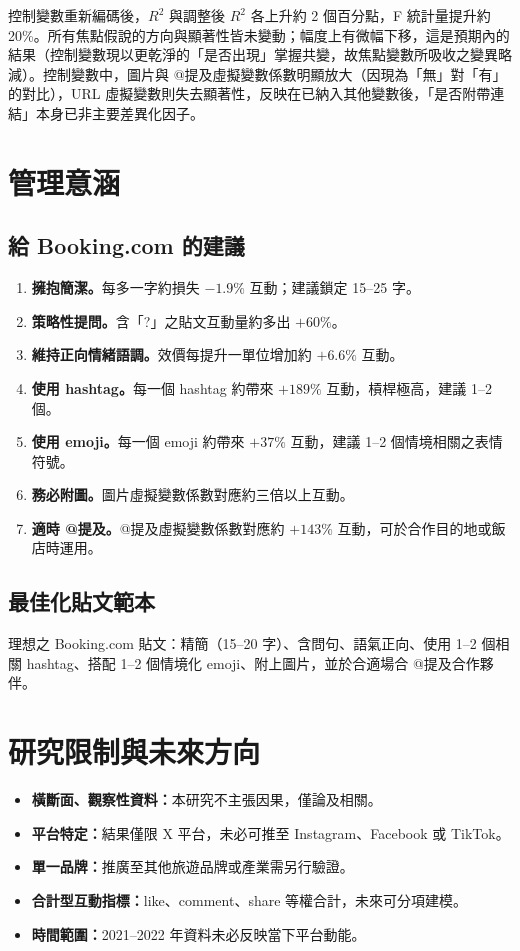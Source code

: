 \documentclass[12pt,a4paper]{ctexart}
\begin{document}
控制變數重新編碼後，$R^2$ 與調整後 $R^2$ 各上升約 2 個百分點，F 統計量提升約 20\%。所有焦點假說的方向與顯著性皆未變動；幅度上有微幅下移，這是預期內的結果（控制變數現以更乾淨的「是否出現」掌握共變，故焦點變數所吸收之變異略減）。控制變數中，圖片與 @提及虛擬變數係數明顯放大（因現為「無」對「有」的對比），URL 虛擬變數則失去顯著性，反映在已納入其他變數後，「是否附帶連結」本身已非主要差異化因子。

\section{管理意涵}

\subsection{給 Booking.com 的建議}

\begin{enumerate}
    \item \textbf{擁抱簡潔。}每多一字約損失 $-1.9\%$ 互動；建議鎖定 15--25 字。
    \item \textbf{策略性提問。}含「?」之貼文互動量約多出 $+60\%$。
    \item \textbf{維持正向情緒語調。}效價每提升一單位增加約 $+6.6\%$ 互動。
    \item \textbf{使用 hashtag。}每一個 hashtag 約帶來 $+189\%$ 互動，槓桿極高，建議 1--2 個。
    \item \textbf{使用 emoji。}每一個 emoji 約帶來 $+37\%$ 互動，建議 1--2 個情境相關之表情符號。
    \item \textbf{務必附圖。}圖片虛擬變數係數對應約三倍以上互動。
    \item \textbf{適時 @提及。}@提及虛擬變數係數對應約 $+143\%$ 互動，可於合作目的地或飯店時運用。
\end{enumerate}

\subsection{最佳化貼文範本}

理想之 Booking.com 貼文：精簡（15--20 字）、含問句、語氣正向、使用 1--2 個相關 hashtag、搭配 1--2 個情境化 emoji、附上圖片，並於合適場合 @提及合作夥伴。

\section{研究限制與未來方向}

\begin{itemize}
    \item \textbf{橫斷面、觀察性資料：}本研究不主張因果，僅論及相關。
    \item \textbf{平台特定：}結果僅限 X 平台，未必可推至 Instagram、Facebook 或 TikTok。
    \item \textbf{單一品牌：}推廣至其他旅遊品牌或產業需另行驗證。
    \item \textbf{合計型互動指標：}like、comment、share 等權合計，未來可分項建模。
    \item \textbf{時間範圍：}2021--2022 年資料未必反映當下平台動能。
\end{itemize}
\end{document}
